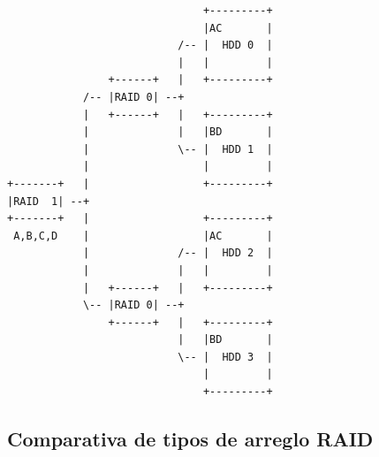 \begin{itemize}
{
\scriptsize
\linespread{1}
\begin{verbatim}
                               +---------+
                               |AC       |
                           /-- |  HDD 0  |
                           |   |         |
                +------+   |   +---------+
            /-- |RAID 0| --+
            |   +------+   |   +---------+
            |              |   |BD       |
            |              \-- |  HDD 1  |
            |                  |         |
+-------+   |                  +---------+
|RAID  1| --+
+-------+   |                  +---------+
 A,B,C,D    |                  |AC       |
            |              /-- |  HDD 2  |
            |              |   |         |
            |   +------+   |   +---------+
            \-- |RAID 0| --+
                +------+   |   +---------+
                           |   |BD       |
                           \-- |  HDD 3  |
                               |         |
                               +---------+
\end{verbatim}
}
  
\end{itemize}

      \subsection {Comparativa de tipos de arreglo RAID}

